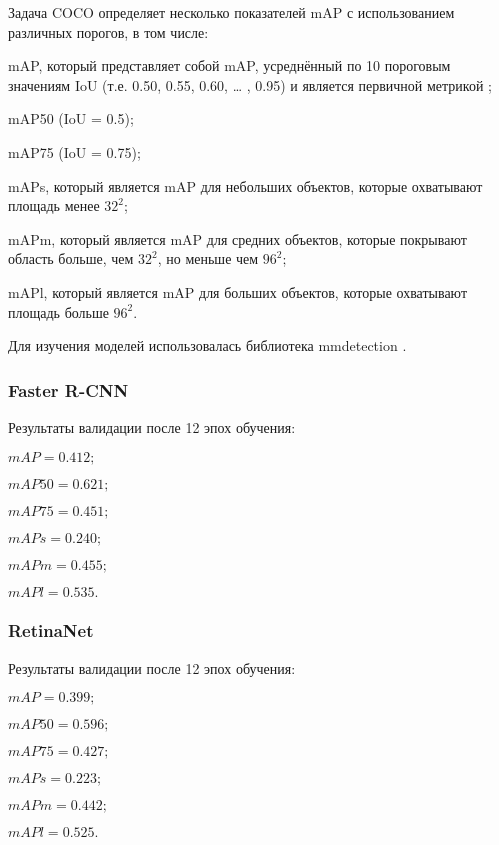 Задача COCO определяет несколько показателей mAP с использованием различных порогов, в том числе:

\begin{itemize*}
	\item mAP, который представляет собой mAP, усреднённый по 10 пороговым значениям IoU (т.е. 0.50, 0.55, 0.60, … , 0.95) и является первичной метрикой ;
	\item mAP50 (IoU = 0.5);
	\item mAP75 (IoU = 0.75);
	\item mAPs, который является mAP для небольших объектов, которые охватывают площадь менее $32^2$;
	\item mAPm, который является mAP для средних объектов, которые покрывают область больше, чем $32^2$,	но меньше чем $96^2$;
	\item mAPl, который является mAP для больших объектов, которые охватывают площадь больше $96^2$.
\end{itemize*}

Для изучения моделей использовалась библиотека mmdetection \cite{mmdetection}.

\subsubsection{Faster R-CNN}
Результаты валидации после 12 эпох обучения:
\begin{itemize*}
	\item $mAP = 0.412;$
	\item $mAP50 = 0.621;$
	\item $mAP75 = 0.451;$
	\item $mAPs = 0.240;$
	\item $mAPm = 0.455;$
	\item $mAPl = 0.535.$
\end{itemize*}

\subsubsection{RetinaNet}
Результаты валидации после 12 эпох обучения:
\begin{itemize*}
	\item $mAP = 0.399;$
	\item $mAP50 = 0.596;$
	\item $mAP75 = 0.427;$
	\item $mAPs = 0.223;$
	\item $mAPm = 0.442;$
	\item $mAPl = 0.525.$
\end{itemize*}

